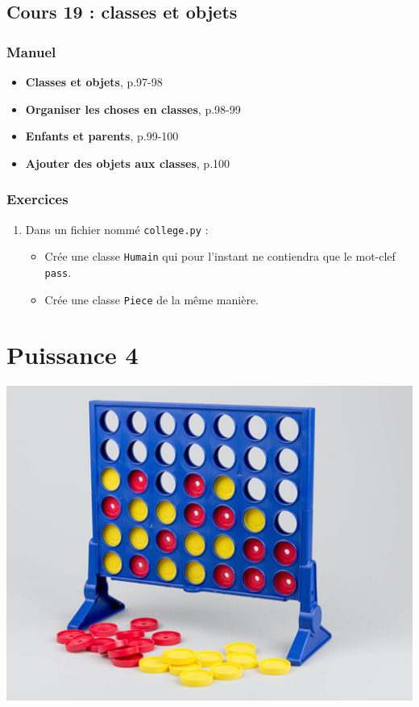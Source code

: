 \documentclass[11pt]{article}
\begin{document}
\subsection*{Cours 19 : classes et objets}
\label{sec:org1b4a261}
\subsubsection*{Manuel}
\label{sec:orgde5ea0f}
\begin{itemize}
\item \textbf{\og Classes et objets\fg{}}, p.97-98
\item \textbf{\og Organiser les choses en classes\fg{}}, p.98-99
\item \textbf{\og Enfants et parents\fg{}}, p.99-100
\item \textbf{\og Ajouter des objets aux classes\fg{}}, p.100
\end{itemize}

\subsubsection*{Exercices}
\label{sec:org17d1e9e}
\begin{enumerate}
\item Dans un fichier nommé \texttt{college.py} :
\begin{itemize}
\item Crée une classe \texttt{Humain} qui pour l'instant ne contiendra que le mot-clef \texttt{pass}.
\item Crée une classe \texttt{Piece} de la même manière.
\end{itemize}
\end{enumerate}

\section*{Puissance 4}
\label{puissance4}
\begin{center}
\includegraphics[width=.9\linewidth]{./img/puissance4.jpg}
\end{center}
\end{document}
